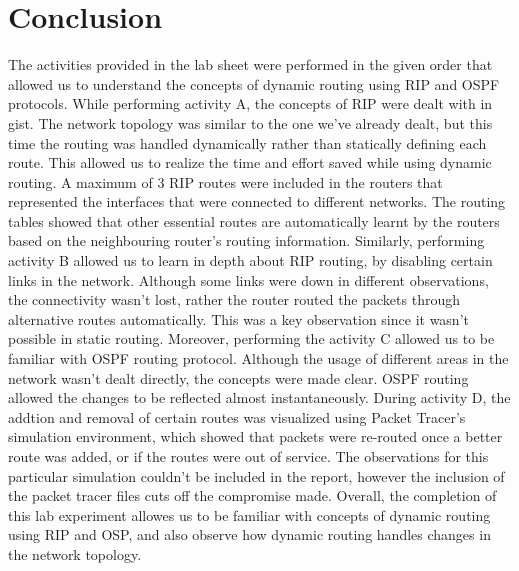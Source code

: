 \documentclass{lab_sheet}
\begin{document}
\section{Conclusion}
The activities provided in the lab sheet were performed in the given order that allowed us to understand the concepts of dynamic routing using RIP and OSPF protocols. While performing activity A, the concepts of RIP were dealt with in gist. The network topology was similar to the one we've already dealt, but this time the routing was handled dynamically rather than statically defining each route. This allowed us to realize the time and effort saved while using dynamic routing. A maximum of 3 RIP routes were included in the routers that represented the interfaces that were connected to different networks. The routing tables showed that other essential routes are automatically learnt by the routers based on the neighbouring router's routing information. Similarly, performing activity B allowed us to learn in depth about RIP routing, by disabling certain links in the network. Although some links were down in different observations, the connectivity wasn't lost, rather the router routed the packets through alternative routes automatically. This was a key observation since it wasn't possible in static routing. Moreover, performing the activity C allowed us to be familiar with OSPF routing protocol. Although the usage of different areas in the network wasn't dealt directly, the concepts were made clear. OSPF routing allowed the changes to be reflected almost instantaneously. During activity D, the addtion and removal of certain routes was visualized using Packet Tracer's simulation environment, which showed that packets were re-routed once a better route was added, or if the routes were out of service. The observations for this particular simulation couldn't be included in the report, however the inclusion of the packet tracer files cuts off the compromise made. Overall, the completion of this lab experiment allowes us to be familiar with concepts of dynamic routing using RIP and OSP, and also observe how dynamic routing handles changes in the network topology.
\end{document}

